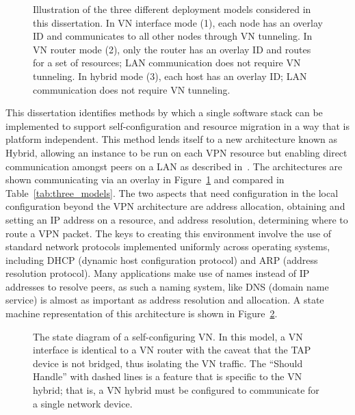 \begin{figure}
\centering
{}

\caption[Three VN Approaches]{Illustration of the three different deployment
models considered in this dissertation. In VN interface mode (1), each node has
an overlay ID and communicates to all other nodes through VN tunneling. In VN
router mode (2), only the router has an overlay ID and routes for a set of
resources; LAN communication does not require VN tunneling. In hybrid mode (3),
each host has an overlay ID; LAN communication does not require VN tunneling.}

\label{fig:three_models}
\end{figure}

This dissertation identifies methods by which a single software stack can be
implemented to support self-configuration and resource migration in a way that
is platform independent.  This method lends itself to a new architecture known
as Hybrid, allowing an instance to be run on each VPN resource but enabling
direct communication amongst peers on a LAN as described in~\cite{sc09}.  The
architectures are shown communicating via an overlay in
Figure~\ref{fig:three_models} and compared in Table~\ref{tab:three_models}.
The two aspects that need configuration in the local configuration beyond the
VPN architecture are address allocation, obtaining and setting an IP address on
a resource, and address resolution, determining where to route a VPN packet.
The keys to creating this environment involve the use of standard network
protocols implemented uniformly across operating systems, including DHCP
(dynamic host configuration protocol) and ARP (address resolution protocol).
Many applications make use of names instead of IP addresses to resolve peers,
as such a naming system, like DNS (domain name service) is almost as important
as address resolution and allocation.  A state machine representation of this
architecture is shown in Figure~\ref{fig:vn}.

\begin{figure}[ht]
\centering
{}
\caption[The state diagram of a self-configuring VN.]{The state diagram of a
self-configuring VN.  In this model, a VN interface is identical to a VN router
with the caveat that the TAP device is not bridged, thus isolating the VN
traffic.  The ``Should Handle'' with dashed lines is a feature that is specific
to the VN hybrid; that is, a VN hybrid must be configured to communicate for a
single network device.}
\label{fig:vn}
\end{figure}

